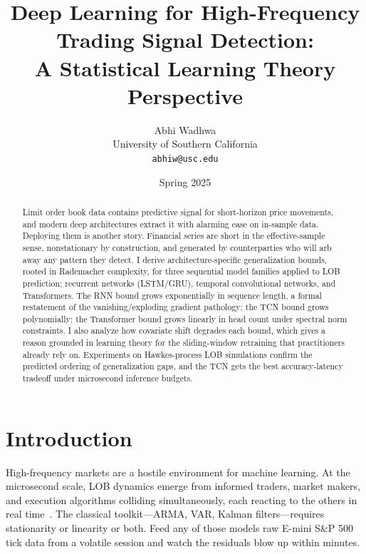 \documentclass[11pt]{article}
\title{Deep Learning for High-Frequency Trading Signal Detection:\\
A Statistical Learning Theory Perspective}
\author{Abhi Wadhwa\\
University of Southern California\\
\texttt{abhiw@usc.edu}}
\date{Spring 2025}
\theoremstyle{definition}
\theoremstyle{remark}
\begin{document}
\maketitle

\begin{abstract}
Limit order book data contains predictive signal for short-horizon price movements, and modern deep architectures extract it with alarming ease on in-sample data.
Deploying them is another story.
Financial series are short in the effective-sample sense, nonstationary by construction, and generated by counterparties who will arb away any pattern they detect.
I derive architecture-specific generalization bounds, rooted in Rademacher complexity, for three sequential model families applied to LOB prediction: recurrent networks (LSTM/GRU), temporal convolutional networks, and Transformers.
The RNN bound grows exponentially in sequence length, a formal restatement of the vanishing/exploding gradient pathology; the TCN bound grows polynomially; the Transformer bound grows linearly in head count under spectral norm constraints.
I also analyze how covariate shift degrades each bound, which gives a reason grounded in learning theory for the sliding-window retraining that practitioners already rely on.
Experiments on Hawkes-process LOB simulations confirm the predicted ordering of generalization gaps, and the TCN gets the best accuracy-latency tradeoff under microsecond inference budgets.
\end{abstract}

\section{Introduction}\label{sec:introduction}

High-frequency markets are a hostile environment for machine learning.
At the microsecond scale, LOB dynamics emerge from informed traders, market makers, and execution algorithms colliding simultaneously, each reacting to the others in real time~\citep{bouchaud2018trades, cont2011statistical}.
The classical toolkit---ARMA, VAR, Kalman filters---requires stationarity or linearity or both.
Feed any of those models raw E-mini S\&P 500 tick data from a volatile session and watch the residuals blow up within minutes.
\end{document}
